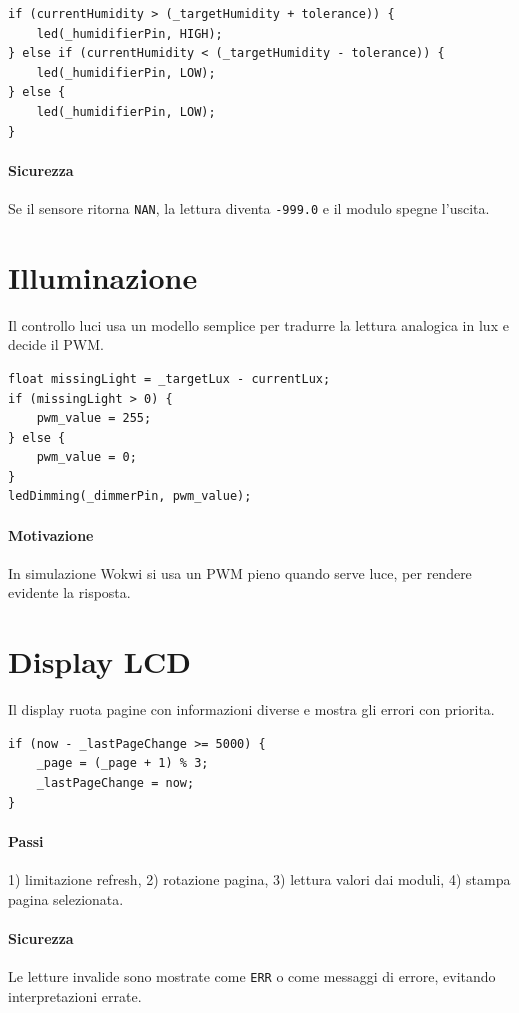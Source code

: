\begin{lstlisting}[style=cppstyle]
if (currentHumidity > (_targetHumidity + tolerance)) {
    led(_humidifierPin, HIGH);
} else if (currentHumidity < (_targetHumidity - tolerance)) {
    led(_humidifierPin, LOW);
} else {
    led(_humidifierPin, LOW);
}
\end{lstlisting}

\paragraph{Sicurezza} Se il sensore ritorna \texttt{NAN}, la lettura diventa \texttt{-999.0} e il modulo spegne l'uscita.

\section{Illuminazione}
Il controllo luci usa un modello semplice per tradurre la lettura analogica in lux e decide il PWM.

\begin{lstlisting}[style=cppstyle]
float missingLight = _targetLux - currentLux;
if (missingLight > 0) {
    pwm_value = 255;
} else {
    pwm_value = 0;
}
ledDimming(_dimmerPin, pwm_value);
\end{lstlisting}

\paragraph{Motivazione} In simulazione Wokwi si usa un PWM pieno quando serve luce, per rendere evidente la risposta.

\section{Display LCD}
Il display ruota pagine con informazioni diverse e mostra gli errori con priorita.

\begin{lstlisting}[style=cppstyle]
if (now - _lastPageChange >= 5000) {
    _page = (_page + 1) % 3;
    _lastPageChange = now;
}
\end{lstlisting}

\paragraph{Passi} 1) limitazione refresh, 2) rotazione pagina, 3) lettura valori dai moduli, 4) stampa pagina selezionata.

\paragraph{Sicurezza} Le letture invalide sono mostrate come \texttt{ERR} o come messaggi di errore, evitando interpretazioni errate.

